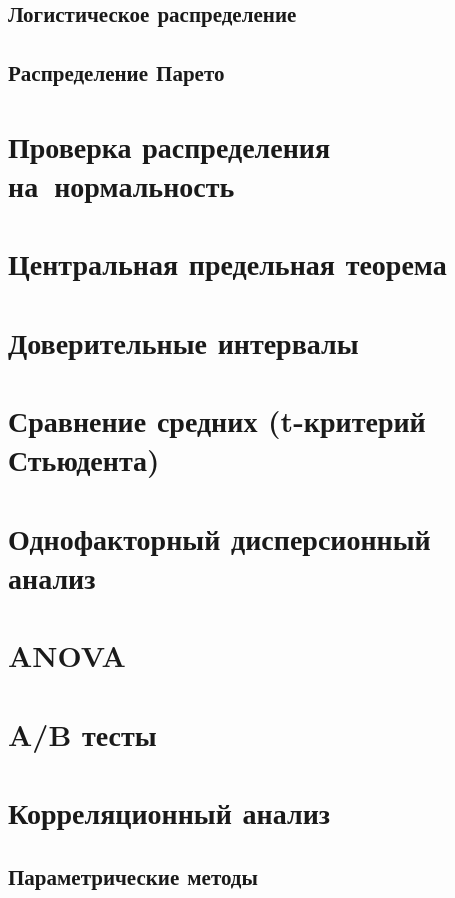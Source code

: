 \documentclass[]{scrartcl}
\begin{document}
\subsection{Логистическое распределение}

\subsection{Распределение Парето}

\section{Проверка распределения на~нормальность}

\section{Центральная предельная теорема}

\section{Доверительные интервалы}

\section{Сравнение средних (t-критерий Стьюдента)}

\section{Однофакторный дисперсионный анализ}

\section{ANOVA}

\section{A/B тесты}

\section{Корреляционный анализ}

\subsection{Параметрические методы}
\end{document}
